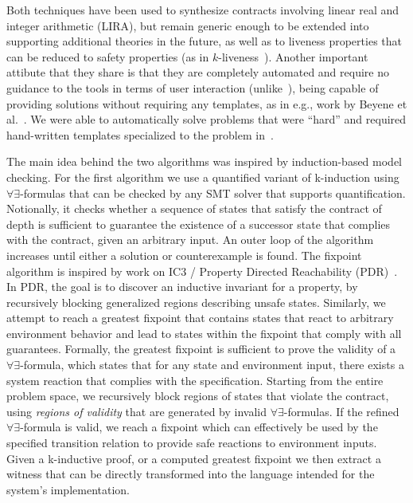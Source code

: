 Both techniques have been used to synthesize contracts involving linear real and integer arithmetic (LIRA), but remain generic enough to be extended into supporting additional theories in the future, as well as to liveness properties that can be reduced to safety properties (as in $k$-liveness~\cite{claessen2012liveness}).  Another important attibute that they share is that they are completely automated and require no guidance to the tools in terms of user interaction (unlike~\cite{ryzhyk2014user,ryzhyk2016developing}), being capable of providing solutions without requiring any templates, as in e.g., work by Beyene et al.~\cite{beyene2014constraint}.  We were able to automatically solve problems that were ``hard'' and required hand-written templates specialized to the problem in~\cite{beyene2014constraint}.

The main idea behind the two algorithms was inspired by induction-based model
checking. For the first algorithm we use a quantified variant of k-induction
using $\forall\exists$-formulas that can be checked by any SMT solver that
supports quantification. Notionally, it checks whether a sequence of states that
satisfy the contract  of depth is sufficient to guarantee the existence of a successor state that complies with the contract, given an arbitrary input. An outer loop of the algorithm increases until either a solution or counterexample is found. The fixpoint algorithm is inspired by work on IC3 / Property Directed Reachability (PDR)~\cite{bradley2011sat,een2011efficient}. In PDR, the goal is to discover an inductive invariant for a property, by recursively blocking generalized regions describing unsafe states. Similarly, we attempt to reach a greatest fixpoint that contains states that react to arbitrary environment behavior and lead to states within the fixpoint that comply with all guarantees. Formally, the greatest fixpoint is sufficient to prove the validity of a $\forall\exists$-formula, which states that for any state and environment input, there exists a system reaction that complies with the specification. Starting from the entire problem space, we recursively block regions of states that violate the contract, using \textit{regions of validity} that are generated by invalid $\forall\exists$-formulas. If the refined $\forall\exists$-formula is valid, we reach a fixpoint which can effectively be used by the specified transition relation to provide safe reactions to environment inputs. Given a k-inductive proof, or a computed greatest fixpoint we then extract a witness that can be directly transformed into the language intended for the system's implementation.

